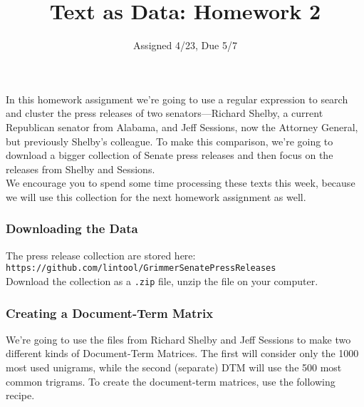 \documentclass[12pt,letterpaper]{article}
\title{Text as Data: Homework 2}
\date{Assigned 4/23, Due 5/7}
\begin{document}
\maketitle


In this homework assignment we're going to use a regular expression to search and cluster the press releases of two senators---Richard Shelby, a current Republican senator from Alabama, and Jeff Sessions, now the Attorney General, but previously Shelby's colleague.  To make this comparison, we're going to download a bigger collection of Senate press releases and then focus on the releases from Shelby and Sessions.  \\

We encourage you to spend some time processing these texts this week, because we will use this collection for the next homework assignment as well.  

\subsubsection*{Downloading the Data}

The press release collection are stored here:\\
{\tt https://github.com/lintool/GrimmerSenatePressReleases} \\

Download the collection as a {\tt .zip} file, unzip the file on your computer.  


\subsubsection*{Creating a Document-Term Matrix}

We're going to use the files from Richard Shelby and Jeff Sessions to make two different kinds of Document-Term Matrices. The first will consider only the 1000 most used unigrams, while the second (separate) DTM will use the 500 most common trigrams. To create the document-term matrices, use the following recipe.
\end{document}
